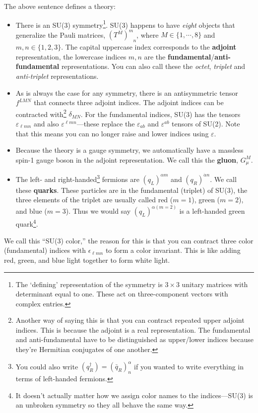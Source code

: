 \documentclass[12pt]{article}
\begin{document}
The above sentence defines a theory:
\begin{itemize}
	\item There is an SU(3) symmetry\footnote{The `defining' representation of the symmetry is $3\times 3$ unitary matrices with determinant equal to one. These act on three-component vectors with complex entries.}.  SU(3) happens to have \emph{eight} objects that generalize the Pauli matrices, $(T^M)^m_{\phantom{m}n}$, where $M\in\{1, \cdots,8\}$ and $m,n\in\{1,2,3\}$. The capital uppercase index corresponds to the \textbf{adjoint} representation, the lowercase indices $m,n$ are the \textbf{fundamental}/\textbf{anti-fundamental} representations. You can also call these the \emph{octet}, \emph{triplet} and \emph{anti-triplet} representations.
	\item As is always the case for any symmetry, there is an antisymmetric tensor $f^{LMN}$ that connects three adjoint indices. The adjoint indices can be contracted with\footnote{Another way of saying this is that you can contract repeated upper adjoint indices. This is because the adjoint is a real representation. The fundamental and anti-fundamental have to be distinguished as upper/lower indices because they're Hermitian conjugates of one another.} $\delta_{MN}$. For the fundamental indices, SU(3) has the tensors $\varepsilon_{\ell m n}$  and also $\varepsilon^{\ell m n}$---these replace the $\varepsilon_{ab}$ and $\varepsilon^{ab}$ tensors of SU(2). Note that this means you can no longer raise and lower indices using $\varepsilon$.
	\item Because the theory is a gauge symmetry, we automatically have a massless spin-1 gauge boson in the adjoint representation. We call this the \textbf{gluon}, $G_\mu^M$. 
	\item The left- and right-handed\footnote{You could also write  $(q_R^\dag)=(\bar q_R)^{\alpha}_n$ if you wanted to write everything in terms of left-handed fermions.} fermions are $(q_L)^{\alpha m}$ and $(q_R)^{\dot\alpha n}$. We call these \textbf{quarks}. These particles are in the fundamental (triplet) of SU(3), the three elements of the triplet are usually called red ($m=1$), green ($m=2$), and blue ($m=3$). Thus we would say $(q_L)^{\alpha (m=2)}$ is a left-handed green quark\footnote{It doesn't actually matter how we assign color names to the indices---SU(3) is an unbroken symmetry so they all behave the same way.}. 
\end{itemize}
We call this ``SU(3) color,'' the reason for this is that you can contract three color (fundamental) indices with $\epsilon_{\ell m n}$ to form a color invariant. This is like adding red, green, and blue light together to form white light. 
\end{document}

